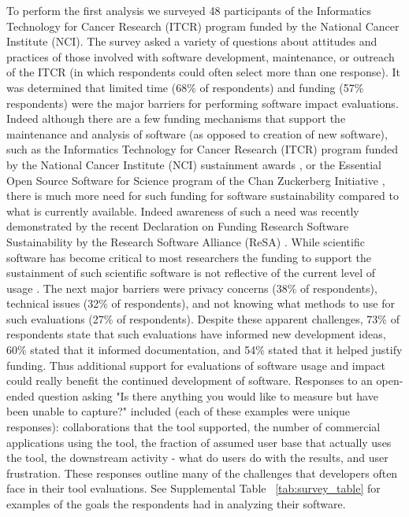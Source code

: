 \documentclass{article}
\begin{document}
To perform the first analysis we surveyed 48 participants of the Informatics Technology for Cancer Research (ITCR) program funded by the National Cancer Institute (NCI). The survey asked a variety of questions about attitudes and practices of those involved with software development, maintenance, or outreach of the ITCR (in which respondents could often select more than one response). It was determined that limited time (68\% of respondents) and funding (57\% respondents) were the major barriers for performing software impact evaluations. Indeed although there are a few funding mechanisms that support the maintenance and analysis of software (as opposed to creation of new software), such as the Informatics Technology for Cancer Research (ITCR) program funded by the National Cancer Institute (NCI) sustainment awards \cite{kibbe_cancer_2017, warner_informatics_2020}, or the Essential Open Source Software for Science program of the Chan Zuckerberg Initiative \cite{CZ_essential_2019}, there is much more need for such funding for software sustainability compared to what is currently available. Indeed awareness of such a need was recently demonstrated by the recent Declaration on Funding Research Software Sustainability by the Research Software Alliance (ReSA) \cite{barker_amsterdam_2023}. While scientific software has become critical to most researchers the funding to support 
 the sustainment of such scientific software is not reflective of the current level of usage \cite{siepel_challenges_2019}. The next major barriers were privacy concerns (38\% of respondents), technical issues (32\% of respondents), and not knowing what methods to use for such evaluations (27\% of respondents). Despite these apparent challenges,  73\% of respondents state that such evaluations have informed new development ideas, 60\% stated that it informed documentation, and 54\% stated that it helped justify funding.  Thus additional support for evaluations of software usage and impact could really benefit the continued development of software. Responses to an open-ended question asking "Is there anything you would like to measure but have been unable to capture?" included (each of these examples were unique responses): collaborations that the tool supported, the number of commercial applications using the tool, the fraction of assumed user base that actually uses the tool, the downstream activity - what do users do with the results, and user frustration. These responses outline many of the challenges that developers often face in their tool evaluations. See Supplemental Table ~\ref{tab:survey_table} for examples of the goals the respondents had in analyzing their software.
\end{document}
